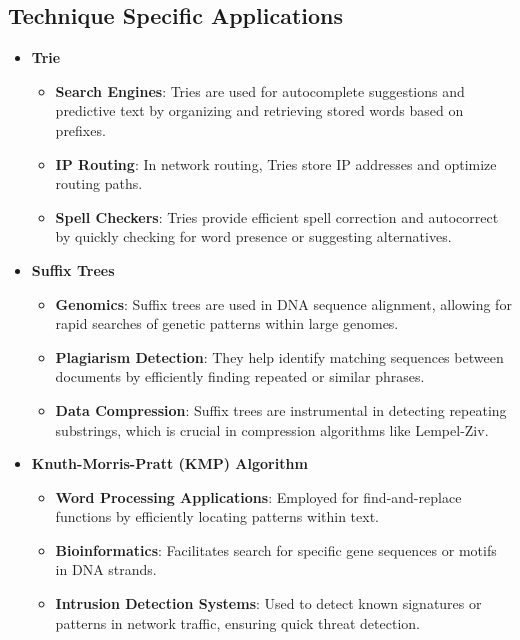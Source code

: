 \documentclass[11pt,a4paper]{article}
\begin{document}
\subsection{Technique Specific Applications}
\begin{itemize}
    \item \textbf{Trie}
    \begin{itemize}
        \item \textbf{Search Engines}: Tries are used for autocomplete suggestions and predictive text by organizing and retrieving stored words based on prefixes.
        \item \textbf{IP Routing}: In network routing, Tries store IP addresses and optimize routing paths.
        \item \textbf{Spell Checkers}: Tries provide efficient spell correction and autocorrect by quickly checking for word presence or suggesting alternatives.
    \end{itemize}

    \item \textbf{Suffix Trees}
    \begin{itemize}
        \item \textbf{Genomics}: Suffix trees are used in DNA sequence alignment, allowing for rapid searches of genetic patterns within large genomes.
        \item \textbf{Plagiarism Detection}: They help identify matching sequences between documents by efficiently finding repeated or similar phrases.
        \item \textbf{Data Compression}: Suffix trees are instrumental in detecting repeating substrings, which is crucial in compression algorithms like Lempel-Ziv.
    \end{itemize}

    \item \textbf{Knuth-Morris-Pratt (KMP) Algorithm}
    \begin{itemize}
        \item \textbf{Word Processing Applications}: Employed for find-and-replace functions by efficiently locating patterns within text.
        \item \textbf{Bioinformatics}: Facilitates search for specific gene sequences or motifs in DNA strands.
        \item \textbf{Intrusion Detection Systems}: Used to detect known signatures or patterns in network traffic, ensuring quick threat detection.
    \end{itemize}


\end{itemize}
\end{document}
